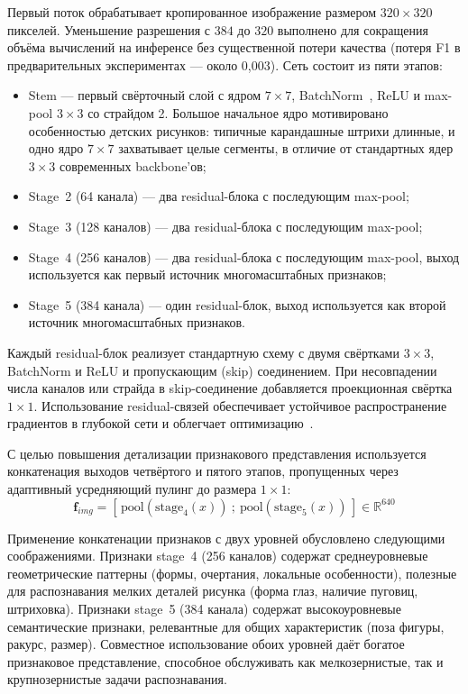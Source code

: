 Первый поток обрабатывает кропированное изображение размером $320 \times 320$ пикселей. Уменьшение разрешения с $384$ до $320$ выполнено для сокращения объёма вычислений на инференсе без существенной потери качества (потеря F1 в предварительных экспериментах --- около 0,003). Сеть состоит из пяти этапов:

\begin{itemize}
    \item Stem --- первый свёрточный слой с ядром $7 \times 7$, BatchNorm~\cite{batchnorm}, ReLU и max-pool $3 \times 3$ со страйдом 2. Большое начальное ядро мотивировано особенностью детских рисунков: типичные карандашные штрихи длинные, и одно ядро $7 \times 7$ захватывает целые сегменты, в отличие от стандартных ядер $3 \times 3$ современных backbone'ов;
    \item Stage~2 (64 канала) --- два residual-блока с последующим max-pool;
    \item Stage~3 (128 каналов) --- два residual-блока с последующим max-pool;
    \item Stage~4 (256 каналов) --- два residual-блока с последующим max-pool, выход используется как первый источник многомасштабных признаков;
    \item Stage~5 (384 канала) --- один residual-блок, выход используется как второй источник многомасштабных признаков.
\end{itemize}

Каждый residual-блок реализует стандартную схему с двумя свёртками $3 \times 3$, BatchNorm и ReLU и пропускающим (skip) соединением. При несовпадении числа каналов или страйда в skip-соединение добавляется проекционная свёртка $1 \times 1$. Использование residual-связей обеспечивает устойчивое распространение градиентов в глубокой сети и облегчает оптимизацию~\cite{resnet}.

С целью повышения детализации признакового представления используется конкатенация выходов четвёртого и пятого этапов, пропущенных через адаптивный усредняющий пулинг до размера $1 \times 1$:
\begin{equation}
\mathbf{f}_{img} = \left[\, \text{pool}(\text{stage}_4(x))\ ;\ \text{pool}(\text{stage}_5(x)) \,\right] \in \mathbb{R}^{640}
\end{equation}

Применение конкатенации признаков с двух уровней обусловлено следующими соображениями. Признаки stage~4 (256 каналов) содержат среднеуровневые геометрические паттерны (формы, очертания, локальные особенности), полезные для распознавания мелких деталей рисунка (форма глаз, наличие пуговиц, штриховка). Признаки stage~5 (384 канала) содержат высокоуровневые семантические признаки, релевантные для общих характеристик (поза фигуры, ракурс, размер). Совместное использование обоих уровней даёт богатое признаковое представление, способное обслуживать как мелкозернистые, так и крупнозернистые задачи распознавания.

